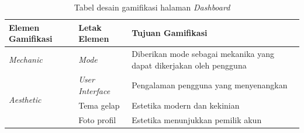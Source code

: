 \begin{table}[H]
	\caption{Tabel desain gamifikasi halaman \textit{Dashboard}}
	\begin{tabular}{|m{3.6cm}|m{}|m{}|}
		\hline
		Elemen Gamifikasi& Letak Elemen & Tujuan Gamifikasi\\
		\hline
		\textit{Mechanic}&\textit{Mode}& Diberikan mode sebagai mekanika yang  dapat dikerjakan oleh pengguna \\
		\hline
		\multirow{3}{1cm}{\textit{Aesthetic}}&\textit{User Interface}&Pengalaman pengguna yang menyenangkan\\
		\cline{2-3}
		& Tema gelap & Estetika modern dan kekinian \\
		\cline{2-3}
		& Foto profil & Estetika menunjukkan pemilik akun \\
		\hline
	\end{tabular}
\end{table}
